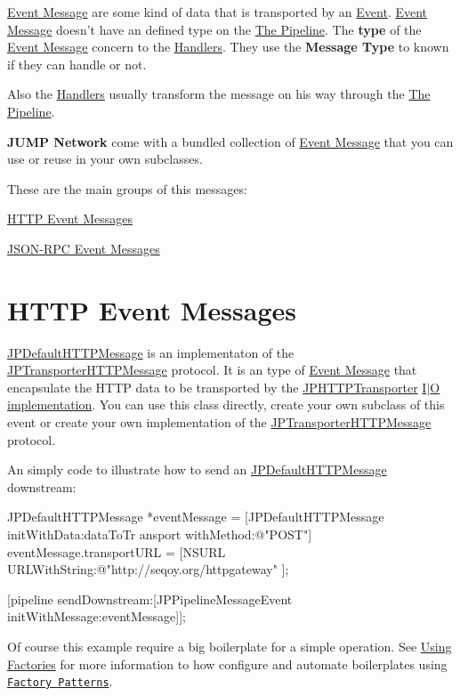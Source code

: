 \hyperlink{a00006}{Event Message} are some kind of data that is transported by an \hyperlink{a00005}{Event}. \hyperlink{a00006}{Event Message} doesn't have an defined type on the \hyperlink{a00001}{The Pipeline}. The {\bfseries type} of the \hyperlink{a00006}{Event Message} concern to the \hyperlink{a00003}{Handlers}. They use the {\bfseries Message Type} to known if they can handle or not. 

Also the \hyperlink{a00003}{Handlers} usually transform the message on his way through the \hyperlink{a00001}{The Pipeline}. 

{\bfseries JUMP Network} come with a bundled collection of \hyperlink{a00006}{Event Message} that you can use or reuse in your own subclasses.\par
 These are the main groups of this messages:
\begin{DoxyItemize}
\item \hyperlink{a00007}{HTTP Event Messages}
\item \hyperlink{a00008}{JSON-\/RPC Event Messages} 
\end{DoxyItemize}\hypertarget{http_messages_page}{}\section{HTTP Event Messages}\label{http_messages_page}
\hyperlink{a00012}{JPDefaultHTTPMessage} is an implementaton of the \hyperlink{a00040}{JPTransporterHTTPMessage} protocol. It is an type of \hyperlink{a00006}{Event Message} that encapsulate the HTTP data to be transported by the \hyperlink{a00014}{JPHTTPTransporter} \hyperlink{a00002}{I$|$O implementation}. You can use this class directly, create your own subclass of this event or create your own implementation of the \hyperlink{a00040}{JPTransporterHTTPMessage} protocol. 

An simply code to illustrate how to send an \hyperlink{a00012}{JPDefaultHTTPMessage} downstream: 
\begin{DoxyCode}
 JPDefaultHTTPMessage *eventMessage = [JPDefaultHTTPMessage initWithData:dataToTr
      ansport withMethod:@"POST"]
 eventMessage.transportURL = [NSURL URLWithString:@"http://seqoy.org/httpgateway"
      ];
 
 [pipeline sendDownstream:[JPPipelineMessageEvent initWithMessage:eventMessage]];
      
\end{DoxyCode}
 Of course this example require a big boilerplate for a simple operation. See \hyperlink{a00004}{Using Factories} for more information to how configure and automate boilerplates using \href{http://en.wikipedia.org/wiki/Factory_method_pattern}{\tt Factory Patterns}.

